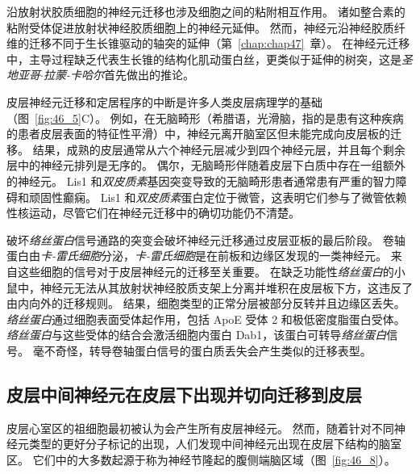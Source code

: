 沿放射状胶质细胞的神经元迁移也涉及细胞之间的粘附相互作用。
诸如整合素的粘附受体促进放射状神经胶质细胞上的神经元延伸。
然而，神经元沿神经胶质纤维的迁移不同于生长锥驱动的轴突的延伸（第~\ref{chap:chap47}~章）。
在神经元迁移中，主导过程缺乏代表生长锥的结构化肌动蛋白丝，更类似于延伸的树突，这是\textit{圣地亚哥$\cdot$拉蒙-卡哈尔}首先做出的推论。


皮层神经元迁移和定居程序的中断是许多人类皮层病理学的基础（图~\ref{fig:46_5}C）。
例如，在无脑畸形（希腊语，光滑脑，指的是患有这种疾病的患者皮层表面的特征性平滑）中，神经元离开脑室区但未能完成向皮层板的迁移。
结果，成熟的皮层通常从六个神经元层减少到四个神经元层，并且每个剩余层中的神经元排列是无序的。
偶尔，无脑畸形伴随着皮层下白质中存在一组额外的神经元。
Lis1 和\textit{双皮质素}基因突变导致的无脑畸形患者通常患有严重的智力障碍和顽固性癫痫。
Lis1 和\textit{双皮质素}蛋白定位于微管，这表明它们参与了微管依赖性核运动，尽管它们在神经元迁移中的确切功能仍不清楚。


破坏\textit{络丝蛋白}信号通路的突变会破坏神经元迁移通过皮层亚板的最后阶段。
卷轴蛋白由\textit{卡-雷氏细胞}分泌，\textit{卡-雷氏细胞}是在前板和边缘区发现的一类神经元。
来自这些细胞的信号对于皮层神经元的迁移至关重要。
在缺乏功能性\textit{络丝蛋白}的小鼠中，神经元无法从其放射状神经胶质支架上分离并堆积在皮层板下方，这违反了由内向外的迁移规则。
结果，细胞类型的正常分层被部分反转并且边缘区丢失。
\textit{络丝蛋白}通过细胞表面受体起作用，包括 ApoE 受体 2 和极低密度脂蛋白受体。
\textit{络丝蛋白}与这些受体的结合会激活细胞内蛋白 Dab1，该蛋白可转导\textit{络丝蛋白}信号。
毫不奇怪，转导卷轴蛋白信号的蛋白质丢失会产生类似的迁移表型。



\subsection{皮层中间神经元在皮层下出现并切向迁移到皮层}

皮层心室区的祖细胞最初被认为会产生所有皮层神经元。
然而，随着针对不同神经元类型的更好分子标记的出现，人们发现中间神经元出现在皮层下结构的脑室区。
它们中的大多数起源于称为神经节隆起的腹侧端脑区域（图~\ref{fig:46_8}）。


